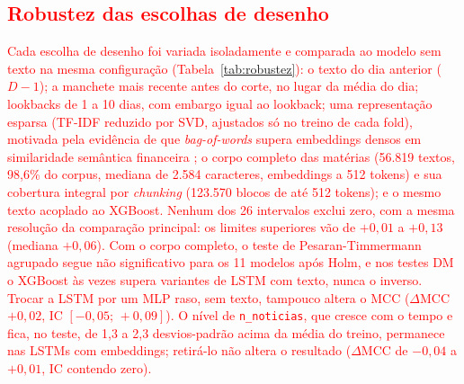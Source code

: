 \documentclass[conference]{IEEEtran}
\newcommand{\novo}[1]{\textcolor{red}{#1}}
\begin{document}
\subsection{\novo{Robustez das escolhas de desenho}}
\label{sec:robustez}
\novo{Cada escolha de desenho foi variada isoladamente e comparada ao modelo sem texto na mesma configura\c{c}\~ao (Tabela~\ref{tab:robustez}): o texto do dia anterior ($D-1$); a manchete mais recente antes do corte, no lugar da m\'edia do dia; lookbacks de 1 a 10 dias, com embargo igual ao lookback; uma representa\c{c}\~ao esparsa (TF-IDF reduzido por SVD, ajustados s\'o no treino de cada fold), motivada pela evid\^encia de que \emph{bag-of-words} supera embeddings densos em similaridade sem\^antica financeira \cite{tangyang2025}; o corpo completo das mat\'erias (56.819 textos, 98,6\% do corpus, mediana de 2.584 caracteres, embeddings a 512 tokens) e sua cobertura integral por \emph{chunking} (123.570 blocos de at\'e 512 tokens); e o mesmo texto acoplado ao XGBoost. Nenhum dos 26 intervalos exclui zero, com a mesma resolu\c{c}\~ao da compara\c{c}\~ao principal: os limites superiores v\~ao de $+0{,}01$ a $+0{,}13$ (mediana $+0{,}06$). Com o corpo completo, o teste de Pesaran-Timmermann agrupado segue n\~ao significativo para os 11 modelos ap\'os Holm, e nos testes DM o XGBoost \`as vezes supera variantes de LSTM com texto, nunca o inverso. Trocar a LSTM por um MLP raso, sem texto, tampouco altera o MCC ($\Delta$MCC $+0{,}02$, IC $[-0{,}05;\,+0{,}09]$).} \novo{O n\'ivel de \texttt{n\_noticias}, que cresce com o tempo e fica, no teste, de 1,3 a 2,3 desvios-padr\~ao acima da m\'edia do treino, permanece nas LSTMs com embeddings; retir\'a-lo n\~ao altera o resultado ($\Delta$MCC de $-0{,}04$ a $+0{,}01$, IC contendo zero).}
\end{document}
